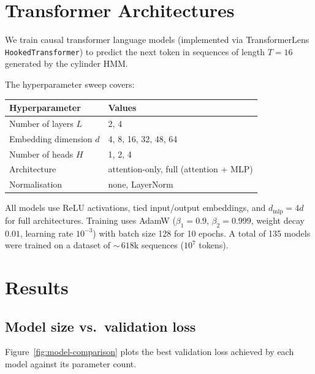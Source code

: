 \documentclass[11pt]{article}
\begin{document}
\section{Transformer Architectures}\label{sec:transformers}

We train causal transformer language models (implemented via
TransformerLens \texttt{HookedTransformer}) to predict the next token in
sequences of length $T = 16$ generated by the cylinder HMM.

The hyperparameter sweep covers:
\begin{center}
\begin{tabular}{ll}
  \toprule
  Hyperparameter & Values \\
  \midrule
  Number of layers $L$        & 2, 4 \\
  Embedding dimension $d$     & 4, 8, 16, 32, 48, 64 \\
  Number of heads $H$         & 1, 2, 4 \\
  Architecture                & attention-only, full (attention + MLP) \\
  Normalisation               & none, LayerNorm \\
  \bottomrule
\end{tabular}
\end{center}
All models use ReLU activations, tied input/output embeddings, and
$d_{\mathrm{mlp}} = 4d$ for full architectures.  Training uses AdamW
($\beta_1 = 0.9$, $\beta_2 = 0.999$, weight decay $0.01$, learning rate
$10^{-3}$) with batch size 128 for 10 epochs.  A total of 135 models
were trained on a dataset of ${\sim}\,618\text{k}$ sequences
($10^7$ tokens).

\section{Results}\label{sec:results}

\subsection{Model size vs.\ validation loss}

Figure~\ref{fig:model-comparison} plots the best validation loss
achieved by each model against its parameter count.
\end{document}
